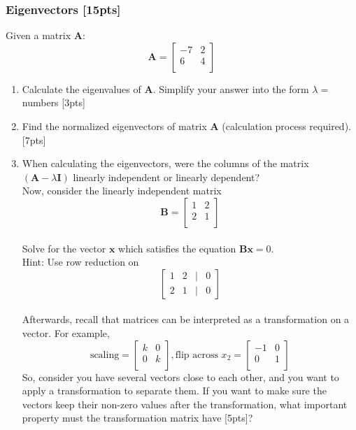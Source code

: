 \documentclass{article}
\begin{document}
\subsubsection{Eigenvectors [15pts]}
Given a matrix $\boldsymbol{A}$:
$$\boldsymbol{A} = \begin{bmatrix} 
    -7 & 2  \\ 
    6 & 4 \\
\end{bmatrix}$$
\begin{enumerate}[label=(\alph*)]
    \item Calculate the eigenvalues of $\boldsymbol{A}$. Simplify your answer into the form $\lambda = $ numbers [3pts]
    \item Find the normalized eigenvectors of matrix $\boldsymbol{A}$ (calculation process required). [7pts]
    \item When calculating the eigenvectors, were the columns of the matrix $(\boldsymbol{A} - \lambda \boldsymbol{I} )$ linearly independent or linearly dependent? \\
    Now, consider the linearly independent matrix $$\boldsymbol{B} = \begin{bmatrix} 
    1 & 2  \\ 
    2 & 1 \\
    \end{bmatrix}$$\\
    Solve for the vector $\boldsymbol{x}$ which satisfies the equation $\boldsymbol{B} \boldsymbol{x} = 0$.\\Hint: Use row reduction on $$\begin{bmatrix} 
        1 & 2 & | & 0\\ 
        2 & 1 & | & 0
    \end{bmatrix}$$\\ Afterwards, recall that matrices can be interpreted as a transformation on a vector. For example,
    $$\text{scaling} = \begin{bmatrix} 
    k & 0  \\ 
    0 & k \\
    \end{bmatrix}, \text{flip across }x_2 = \begin{bmatrix} 
    -1 & 0  \\ 
    0 & 1 \\
    \end{bmatrix}$$
    So, consider you have several vectors close to each other, and you want to apply a transformation to separate them. If you want to make sure the vectors keep their non-zero values after the transformation, what important property must the transformation matrix have [5pts]?
\end{enumerate}
\end{document}
